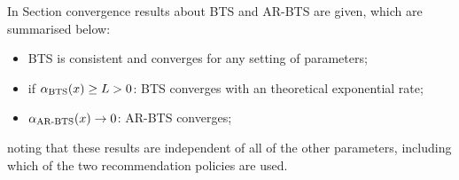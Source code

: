         In Section  convergence results about BTS and AR-BTS are given, which are summarised below:
        \begin{itemize}
            \item BTS is consistent and converges for any setting of parameters;
            \item if ${\alpha_{{\textnormal{BTS}}}}(x) \geq L > 0$: BTS converges with an theoretical exponential rate;
            \item ${\alpha_{{\textnormal{AR-BTS}}}}(x) \rightarrow 0$: AR-BTS converges;
        \end{itemize}
        noting that these results are independent of all of the other parameters, including which of the two recommendation policies are used. 

















